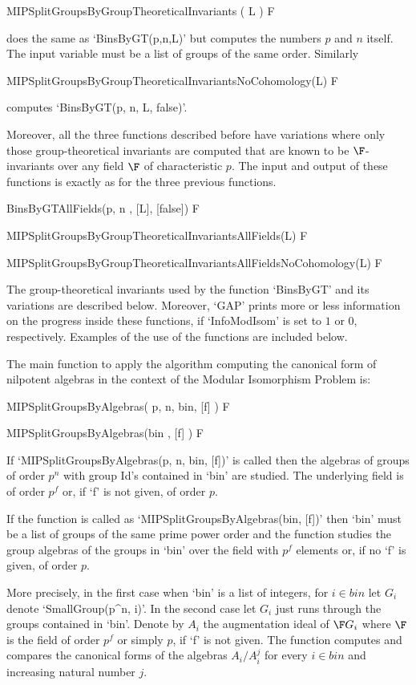 \> MIPSplitGroupsByGroupTheoreticalInvariants ( L ) F

does the same as `BinsByGT(p,n,L)' but computes the numbers $p$ and
$n$ itself. The input variable must be a list of groups of the same
order. Similarly

\> MIPSplitGroupsByGroupTheoreticalInvariantsNoCohomology(L) F	

computes `BinsByGT(p, n, L, false)'.


Moreover, all the three functions described before have variations
where only those group-theoretical invariants are computed that 
are known to be $\F$-invariants over any field $\F$ of 
characteristic $p$. The input and output of these functions is exactly 
as for the three previous functions.

\> BinsByGTAllFields(p, n , [L], [false]) F

\> MIPSplitGroupsByGroupTheoreticalInvariantsAllFields(L) F

\> MIPSplitGroupsByGroupTheoreticalInvariantsAllFieldsNoCohomology(L) F

The group-theoretical invariants used by the function
`BinsByGT' and its variations are described below. 
Moreover, `GAP' prints more or less information on the progress 
inside these functions, if `InfoModIsom' is set to $1$ or $0$,
respectively. Examples of the use of the functions are included
below.

The main function to apply the algorithm computing the canonical
form of nilpotent algebras in the context of the Modular
Isomorphism Problem is:

\> MIPSplitGroupsByAlgebras( p, n, bin, [f] ) F

\> MIPSplitGroupsByAlgebras(bin , [f] ) F

If `MIPSplitGroupsByAlgebras(p, n, bin, [f])' is called then the algebras
of groups of order $p^n$ with group Id's contained in `bin' are studied.
The underlying field is of order $p^f$ or, if `f' is not given, of 
order $p$. 

If the function is called as `MIPSplitGroupsByAlgebras(bin, [f])' then
`bin' must be a list of groups of the same prime power order and the function
studies the group algebras of the groups in `bin' over the field with $p^f$
elements or, if no `f' is given, of order $p$.

More precisely, in the first case when `bin' is a list of integers,
for $i \in bin$ let $G_i$ denote `SmallGroup(p^n, i)'.
In the second case let $G_i$ just runs through the groups contained in `bin'.
Denote by $A_i$ the augmentation ideal of $\F G_i$ where $\F$ is the field
of order $p^f$ or simply $p$, if `f' is not given.
 The function computes and compares the canonical forms of the algebras 
 $A_i / A_i^j$ for every $i \in bin$ and increasing natural number $j$. 

